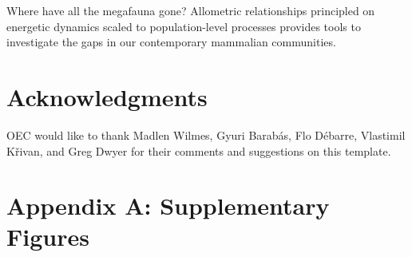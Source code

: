\documentclass[11pt]{article}
\begin{document}
Where have all the megafauna gone? 
Allometric relationships principled on energetic dynamics scaled to population-level processes provides tools to investigate the gaps in our contemporary mammalian communities.



\section*{Acknowledgments}

OEC would like to thank Madlen Wilmes, Gyuri Barab\'{a}s, Flo D\'{e}barre, Vlastimil K\v{r}ivan, and Greg Dwyer for their comments and suggestions on this template.

\newpage{}

\section*{Appendix A: Supplementary Figures}

%
%
%
%
%
\end{document}

